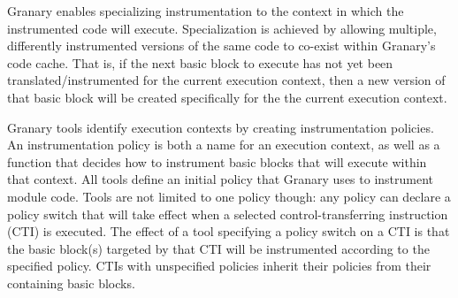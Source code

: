 \documentclass[preprint]{sigplanconf}
\newcommand{\toolname}[1]{{\scshape #1}}
\begin{document}


Granary enables specializing instrumentation to the context in which the instrumented code will execute. Specialization is achieved by allowing multiple, differently instrumented versions of the same code to co-exist within Granary's code cache. That is, if the next basic block to execute has not yet been translated/instrumented for the current execution context, then a new version of that basic block will be created  specifically for the the current execution context.




Granary tools identify execution contexts by creating instrumentation policies. An instrumentation policy is both a name for an execution context, as well as a function that decides how to instrument basic blocks that will execute within that context. All tools define an initial policy that Granary uses to instrument module code. Tools are not limited to one policy though: any policy can declare a policy switch that will take effect when a selected control-transferring instruction (CTI) is executed. The effect of a tool specifying a policy switch on a CTI is that the basic block(s) targeted by that CTI will be instrumented according to the specified policy. CTIs with unspecified policies inherit their policies from their containing basic blocks.
\end{document}
